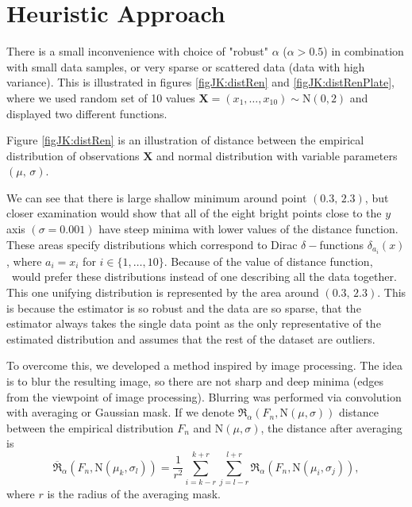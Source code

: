 \section{Heuristic Approach}
There is a small inconvenience with choice of "robust" $\alpha$ ($\alpha > 0.5$) in combination with small data samples, or very sparse or scattered data (data with high variance). This is illustrated in figures \ref{figJK:distRen} and \ref{figJK:distRenPlate}, where we used random set of 10 values $\mathbf{X} = (x_1, \ldots, x_{10}) \sim \mathrm{N}(0,2)$ and displayed two different functions.

\begin{figure}[h]
  \centering
  \:%
  \end{figure}

Figure \ref{figJK:distRen} is an illustration of \ren distance between the empirical distribution of observations $\mathbf{X}$ and normal distribution with variable parameters $(\mu,\, \sigma)$. 

We can see that there is large shallow minimum around point $(0.3, \, 2.3)$, but closer examination would show that all of the eight bright points close to the $y$ axis $(\sigma = 0.001)$ have steep minima with lower values of the distance function. These areas specify distributions which correspond to Dirac $\delta-$functions $\delta_{a_i}(x)$, where $a_i = x_i$ for $i \in \{1,\ldots,10\}$. Because of the value of distance function, \mRao\ would prefer these distributions instead of one describing all the data together. This one unifying distribution is represented by the area around $(0.3, \, 2.3)$. This is because the estimator is so robust and the data are so sparse, that the estimator always takes the single data point as the only representative of the estimated distribution and assumes that the rest of the dataset are outliers. 

To overcome this, we developed a method inspired by image processing. The idea is to blur the resulting image, so there are not sharp and deep minima (edges from the viewpoint of image processing). Blurring was performed via convolution with averaging or Gaussian mask. If we denote $\mathfrak{R}_\alpha(F_n, \mathrm{N}(\mu,\sigma))$  \ren distance between the empirical distribution $F_n$ and $\mathrm{N}(\mu,\sigma)$, the distance after averaging is 
\begin{equation}
\overline{\mathfrak{R}}_\alpha(F_n, \mathrm{N}(\mu_k,\sigma_l)) = \dfrac{1}{r^2}\sum_{i=k-r}^{k+r} \sum_{j=l-r}^{l+r} \mathfrak{R}_\alpha(F_n, \mathrm{N}(\mu_i,\sigma_j)) ,
\end{equation}
where $r$ is the radius of the averaging mask.

